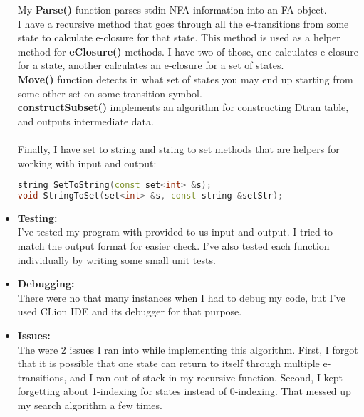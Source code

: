 \documentclass[12pt, letterpaper]{article}
\begin{document}
\begin{itemize}
	My {\bf Parse()} function parses stdin  NFA information into an FA object.\\
	I have a recursive method that goes through all the e-transitions from some state to calculate e-closure for that state. This method is used as a helper method for {\bf eClosure() } methods. I have two of those, one calculates e-closure for a state, another calculates an e-closure for a set of states.\\
	{\bf Move() } function detects in what set of states you may end up starting from some other set on some transition symbol.\\
	{\bf constructSubset() } implements an  algorithm for constructing Dtran table, and outputs intermediate data.\\
	\\
	Finally, I have set to string and string to set methods that are helpers for working with input and output:
	\begin{lstlisting}[language=C++]
string SetToString(const set<int> &s);
void StringToSet(set<int> &s, const string &setStr);
	\end{lstlisting}
	\item {\bf Testing:} \\
	I've tested my program with provided to us input and output. I tried to match the output format for easier check. I've also tested each function individually by writing some small unit tests.
	
	\item {\bf Debugging:} \\
	There were no that many instances when I had to debug my code, but I've used CLion IDE and its debugger for that purpose.
	
	 \item {\bf Issues:} \\
	 The were 2 issues I ran into while implementing this algorithm. First, I forgot that it is possible that one state can return to itself through multiple e-transitions, and I ran out of stack in my recursive function.
	 Second, I kept forgetting about 1-indexing for states instead of 0-indexing. That messed up my search algorithm a few times.
\end{itemize}
\end{document}
